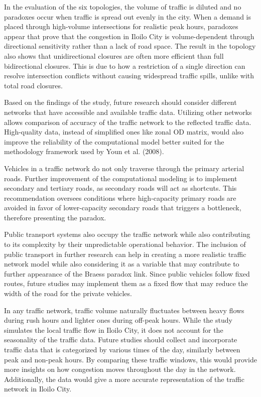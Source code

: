In the evaluation of the six topologies, the volume of traffic is diluted and no paradoxes occur when traffic is spread out evenly in the city. When a demand is placed through high-volume intersections for realistic peak hours, paradoxes appear that prove that the congestion in Iloilo City is volume-dependent through directional sensitivity rather than a lack of road space. The result in the topology also shows that unidirectional closures are often more efficient than full bidirectional closures. This is due to how a restriction of a single direction can resolve intersection conflicts without causing widespread traffic spills, unlike with total road closures.

Based on the findings of the study, future research should consider different networks that have accessible and available traffic data. Utilizing other networks allows comparison of accuracy of the traffic network to the reflected traffic data. High-quality data, instead of simplified ones like zonal OD matrix, would also improve the reliability of the computational model better suited for the methodology framework used by Youn et al. (2008).

Vehicles in a traffic network do not only traverse through the primary arterial roads. Further improvement of the computational modeling is to implement secondary and tertiary roads, as secondary roads will act as shortcuts. This recommendation oversees conditions where high-capacity primary roads are avoided in favor of lower-capacity secondary roads that triggers a bottleneck, therefore presenting the paradox. 

Public transport systems also occupy the traffic network while also contributing to its complexity by their unpredictable operational behavior. The inclusion of public transport in further research can help in creating a more realistic traffic network model while also considering it as a variable that may contribute to further appearance of the Braess paradox link. Since public vehicles follow fixed routes, future studies may implement them as a fixed flow that may reduce the width of the road for the private vehicles. 

In any traffic network, traffic volume naturally fluctuates between  heavy flows during rush hours and lighter ones during off-peak hours. While the study simulates the local traffic flow in Iloilo City, it does not account for the seasonality of the traffic data. Future studies should collect and incorporate traffic data that is categorized by various times of the day, similarly between peak and non-peak hours. By comparing these traffic windows, this would provide more insights on how congestion moves throughout the day in the network. Additionally, the data would give a more accurate representation of the traffic network in Iloilo City.

